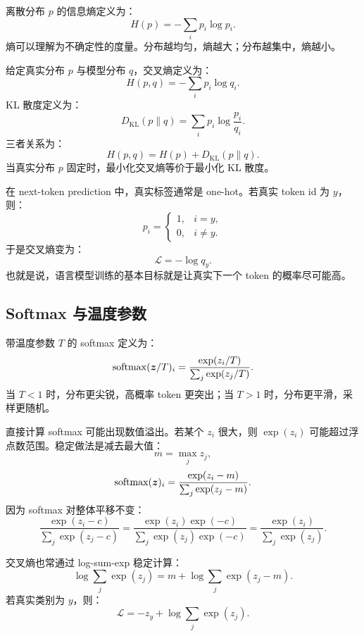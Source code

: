 离散分布 $p$ 的信息熵定义为：
\[
  H(p)=-\sum_{i}p_i\log p_i.
\]
熵可以理解为不确定性的度量。分布越均匀，熵越大；分布越集中，熵越小。

给定真实分布 $p$ 与模型分布 $q$，交叉熵定义为：
\[
  H(p,q)=-\sum_i p_i\log q_i.
\]
KL 散度定义为：
\[
  D_{\mathrm{KL}}(p\|q)
  =
  \sum_i p_i\log\frac{p_i}{q_i}.
\]
三者关系为：
\[
  H(p,q)=H(p)+D_{\mathrm{KL}}(p\|q).
\]
当真实分布 $p$ 固定时，最小化交叉熵等价于最小化 KL 散度。

在 next-token prediction 中，真实标签通常是 one-hot。若真实 token id 为 $y$，则：
\[
  p_i=
  \begin{cases}
    1, & i=y,\\
    0, & i\ne y.
  \end{cases}
\]
于是交叉熵变为：
\[
  \mathcal{L}
  =
  -\log q_y.
\]
也就是说，语言模型训练的基本目标就是让真实下一个 token 的概率尽可能高。

\subsection{Softmax 与温度参数}
\label{subsec:softmax-temperature}

带温度参数 $T$ 的 softmax 定义为：
\[
  \operatorname{softmax}(\bm{z}/T)_i
  =
  \frac{\exp(z_i/T)}{\sum_j\exp(z_j/T)}.
\]
当 $T<1$ 时，分布更尖锐，高概率 token 更突出；当 $T>1$ 时，分布更平滑，采样更随机。

直接计算 softmax 可能出现数值溢出。若某个 $z_i$ 很大，则 $\exp(z_i)$ 可能超过浮点数范围。稳定做法是减去最大值：
\[
  m=\max_j z_j,
\]
\[
  \operatorname{softmax}(\bm{z})_i
  =
  \frac{\exp(z_i-m)}{\sum_j\exp(z_j-m)}.
\]
因为 softmax 对整体平移不变：
\[
  \frac{\exp(z_i-c)}{\sum_j\exp(z_j-c)}
  =
  \frac{\exp(z_i)\exp(-c)}{\sum_j\exp(z_j)\exp(-c)}
  =
  \frac{\exp(z_i)}{\sum_j\exp(z_j)}.
\]

交叉熵也常通过 log-sum-exp 稳定计算：
\[
  \log\sum_j\exp(z_j)
  =
  m+\log\sum_j\exp(z_j-m).
\]
若真实类别为 $y$，则：
\[
  \mathcal{L}
  =
  -z_y+\log\sum_j\exp(z_j).
\]

